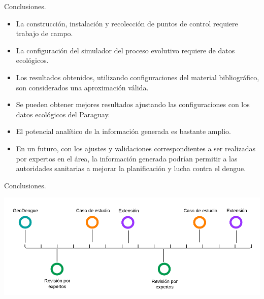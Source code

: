 \begin{frame}[t]{Conclusiones.}
    \begin{itemize}

        \item La construcción, instalación y recolección de puntos de control requiere trabajo de campo.

        \item La configuración del simulador del proceso evolutivo requiere de datos ecológicos.

        \item Los resultados obtenidos, utilizando configuraciones del material bibliográfico, son considerados una aproximación válida.

        \item Se pueden obtener mejores resultados ajustando las configuraciones con los datos ecológicos del Paraguay.

        \item El potencial analítico de la información generada es bastante amplio.

        \item En un futuro, con los ajustes y validaciones correspondientes a ser realizadas por expertos en el área, la información generada podrían permitir a las autoridades sanitarias a mejorar la planificación y lucha contra el dengue.
    \end{itemize}
\end{frame}

\begin{frame}[c]{Conclusiones.}
  \begin{center}
    \includegraphics[width=\textwidth]{./graphics/linea-tiempo.png}
  \end{center}
\end{frame}

